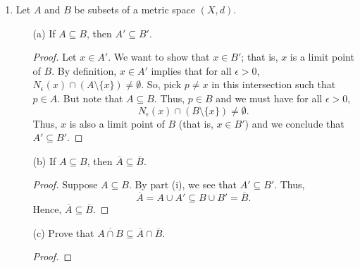 \documentclass[a4paper]{article}
\begin{document}
\begin{enumerate}
\begin{proof}
    \( (\Longleftarrow ) \) Let \( x,y \in \R  \) such that \( x < y  \). We will show that there exists \( p \in E  \) such that \( x < p < y \). Suppose that \( \R = \overline{E}  \). Since \( x \in \R  \), we must have \( x \in \overline{E}  \). That is, for all \( \epsilon > 0  \), we have  
    \[  {N}_{\epsilon}(x) \cap E \neq \emptyset.  \]
    This implies that \( {N}_{\epsilon}(x)  \) contains a point \( p \neq  x   \) such that \( p \in E  \). This means that \( p \in (x - \epsilon , x + \epsilon) \) and so
    \[  x - \epsilon < p < x + \epsilon.  \]
    Since \( x < y  \), we have that 
    \[  x - \epsilon <  p < y  + \epsilon. \]
    Since \( \epsilon > 0 \) is arbitrary, we find that \( x < p < y  \) for some \( p \in E  \).
\end{proof}
    \item Let \( A  \) and \( B  \) be subsets of a metric space \( (X,d) \).
        \begin{enumerate}
            \item[(a)] If \( A \subseteq B  \), then \( A' \subseteq B' \).
                \begin{proof}
                Let \( x \in A' \). We want to show that \( x \in B' \); that is, \( x  \) is a limit point of \( B  \). By definition, \( x \in A'  \) implies that for all \( \epsilon > 0  \), \( {N}_{\epsilon}(x) \cap (A \setminus  \{ x \} ) \neq \emptyset \). So, pick \( p \neq x  \) in this intersection such that \( p \in A  \). But note that \( A \subseteq B  \). Thus, \( p \in  B \) and we must have for all \( \epsilon > 0 \), 
                \[  {N}_{\epsilon}(x) \cap (B \setminus  \{ x \}) \neq \emptyset. \]
                Thus, \( x  \) is also a limit point of \( B  \) (that is, \( x \in B' \)) and we conclude that \( A' \subseteq  B' \).
                \end{proof}
            \item[(b)] If \( A \subseteq  B  \), then \( \overline{A} \subseteq \overline{B} \).
                \begin{proof}
                Suppose \( A \subseteq  B  \). By part (i), we see that \( A' \subseteq  B ' \). Thus, 
                \[  \overline{A} = A \cup A' \subseteq  B \cup B' = \overline{B}. \]
                Hence, \( \overline{A} \subseteq \overline{B} \).
                \end{proof}
            \item[(c)] Prove that \( \overline{A \cap B} \subseteq \overline{A} \cap \overline{B} \).
                \begin{proof}

\end{proof}
\end{enumerate}
\end{enumerate}
\end{document}
